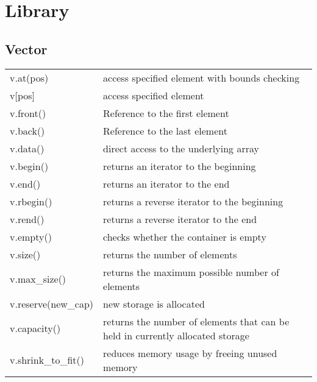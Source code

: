\section{Library}
\subsection{Vector}
\begin{center}
	\renewcommand\tabularxcolumn[1]{m{#1}}
	\begin{tabularx}{\columnwidth}{ | l  X | } 
		\hline
		v.at(pos)&access specified element with bounds checking\\
		
		v[pos] &access specified element\\
		
		v.front() &Reference to the first element\\
		
		v.back() & Reference to the last element\\
		
		v.data() & direct access to the underlying array\\
		
		v.begin()& returns an iterator to the beginning\\
		
		v.end() & returns an iterator to the end\\
		
		v.rbegin()& returns a reverse iterator to the beginning\\
		
		v.rend()& returns a reverse iterator to the end\\
		
		v.empty()& checks whether the container is empty\\
		
		v.size() & returns the number of elements\\
		
		v.max\_size()& returns the maximum possible number of elements\\
		
		v.reserve(new\_cap)& new storage is allocated\\
		
		v.capacity()& returns the number of elements that can be held in currently allocated storage\\
		
		v.shrink\_to\_fit() & reduces memory usage by freeing unused memory\\
		

\end{tabularx}
\end{center}
